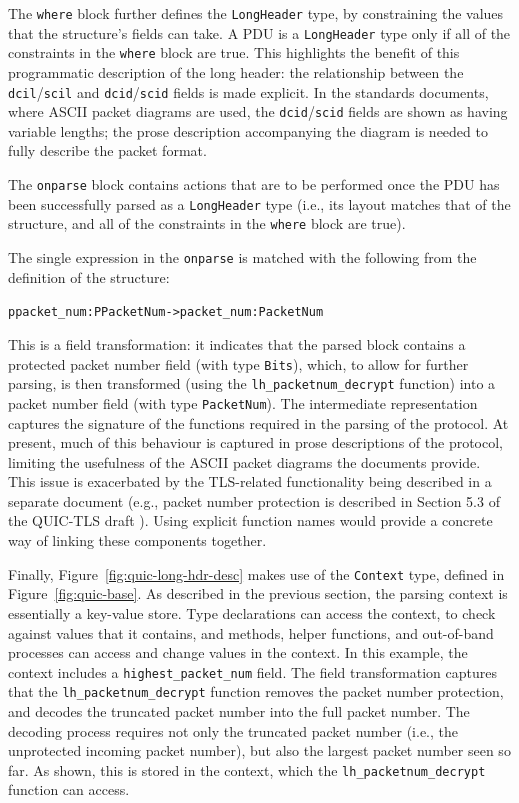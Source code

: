 \documentclass[10pt,sigconf]{acmart}
\begin{document}
The \texttt{where} block further defines the \texttt{LongHeader} type, by constraining the
values that the structure's fields can take. A PDU is a \texttt{LongHeader} type only if
all of the constraints in the \texttt{where} block are true. This highlights the benefit
of this programmatic description of the long header: the relationship
between the \texttt{dcil}/\texttt{scil} and \texttt{dcid}/\texttt{scid} fields is made
explicit. In the standards documents, where ASCII packet diagrams are used, the
\texttt{dcid}/\texttt{scid} fields are shown as having variable lengths; the prose
description accompanying the diagram is needed to fully describe the packet format.

The \texttt{onparse} block contains actions that are to be performed once the PDU has been
successfully parsed as a \texttt{LongHeader} type (i.e., its layout matches that of
the structure, and all of the constraints in the \texttt{where} block are true).

The single expression in the \texttt{onparse} is matched with the following from the
definition of the structure:
\footnotesize
\begin{alltt}
    ppacket_num : PPacketNum -> packet_num : PacketNum
\end{alltt}
\normalsize
This is a field transformation: it indicates that the parsed block
contains a protected packet number field (with type \texttt{Bits}), which, to allow
for further parsing, is then transformed (using the \texttt{lh\_packetnum\_decrypt} function)
into a packet number field (with type \texttt{PacketNum}). The intermediate
representation captures the signature of the functions required in the parsing of the
protocol. At present, much of this behaviour is captured in prose descriptions of the
protocol, limiting the usefulness of the ASCII packet diagrams the documents provide.
This issue is exacerbated by the TLS-related functionality being described in a separate
document (e.g., packet number protection is described in Section 5.3 of the
QUIC-TLS draft \cite{draft-ietf-quic-tls-14}). Using explicit function names would provide
a concrete way of linking these components together. 

Finally, Figure~\ref{fig:quic-long-hdr-desc} makes use of the \texttt{Context} type,
defined in Figure~\ref{fig:quic-base}. As
described in the previous section, the parsing context is essentially a key-value store. Type
declarations can access the context, to check against values that it contains, and methods,
helper functions, and out-of-band processes can access and change values in the context. In
this example, the context includes a \texttt{highest\_packet\_num} field. The field
transformation captures that the
\texttt{lh\_packetnum\_decrypt} function removes the packet
number protection, and decodes the truncated packet number into the full packet number.
The decoding process requires not only the truncated packet number (i.e., the unprotected
incoming packet number), but also the largest packet number seen so far. As shown, this is
stored in the context, which the \texttt{lh\_packetnum\_decrypt} function can access.
\end{document}
